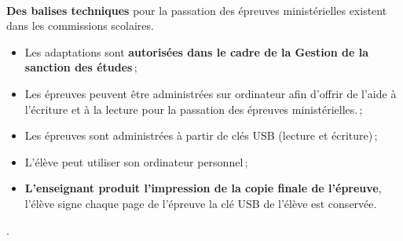 \documentclass{beamer}
\begin{document}
\begin{frame}[allowframebreaks]
\begin{description}
\begin{itemize}
						\end{itemize}
					\framebreak
					\item[Élèves à besoin particulier]  \ \ \par \textbf{Des balises techniques} pour la passation des épreuves ministérielles existent dans les commissions scolaires.
					\begin{itemize}
						\item Les adaptations sont \textbf{autorisées dans le cadre de la Gestion de la sanction des études}\,;
						\item Les épreuves peuvent être administrées sur ordinateur afin d'offrir de {l'aide à l’écriture et à
la lecture} pour la passation des épreuves ministérielles.\,;
						\item Les épreuves sont administrées à partir de clés USB (lecture et écriture)\,;
						\item L'élève peut utiliser son ordinateur personnel\,;
						\item \textbf{L'enseignant produit l'impression de la copie finale de l'épreuve}, l'élève signe chaque page de l'épreuve la clé USB de l'élève est conservée.
\end{itemize}.
					

\end{description}
			\end{frame}
			
			
\end{document}
